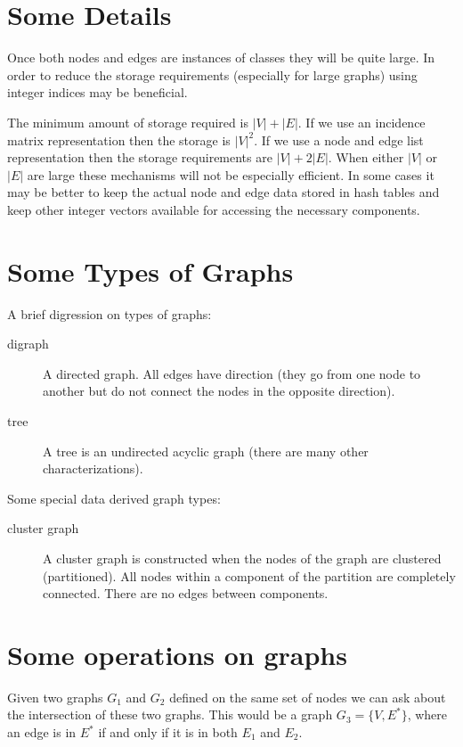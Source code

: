 \section{Some Details}

Once both nodes and edges are instances of classes they will be quite
large. In order to reduce the storage requirements (especially for
large graphs) using integer indices may be beneficial.

The minimum amount of storage required is $|V|+|E|$. If we use an 
incidence matrix representation then the storage is $|V|^2$.
If we use a node and edge list representation then the storage
requirements are $|V|+2|E|$. When either $|V|$ or $|E|$ are large
these mechanisms will not be especially efficient.
In some cases it may be better to keep the actual node and edge data
stored in hash tables and keep other integer vectors available for
accessing the necessary components.

\section{Some Types of Graphs}

A brief digression on types of graphs:
\begin{description}
\item[digraph] A directed graph. All edges have direction (they go
  from one node to another but do not connect the nodes in the
  opposite direction).
\item[tree] A tree is an undirected acyclic graph (there are many
  other characterizations).
\end{description}

Some special data derived graph types:
\begin{description}
\item[cluster graph] A cluster graph is constructed when the nodes of
  the graph are clustered (partitioned). All nodes within a component
  of the partition are completely connected. There are no edges
  between components.
\end{description}


\section{Some operations on graphs}

Given two graphs $G_1$ and $G_2$ defined on the same set of nodes
we can ask about the intersection of these two graphs. This would be a
graph $G_3 = \{V, E^* \}$, where an edge is in $E^*$ if and only if it
is in both $E_1$ and $E_2$.

